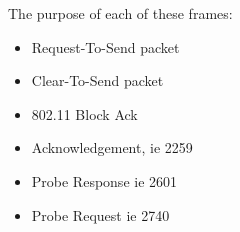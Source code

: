 The purpose of each of these frames:
\begin{itemize}
\item Request-To-Send packet
\item Clear-To-Send packet
\item 802.11 Block Ack
\item Acknowledgement, ie 2259
\item Probe Response ie 2601
\item Probe Request ie 2740
\end{itemize}
